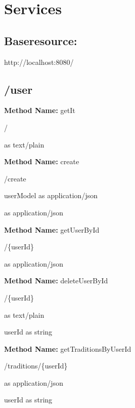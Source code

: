 \chapter{Services}
\section{Baseresource: }
http://localhost:8080/
\section{/user}
\textbf{Method Name: }getIt
\begin{get}
/
\end{get}
\begin{response}
 as text/plain
\end{response}
\textbf{Method Name: }create
\begin{post}
/create
\end{post}
\begin{request}
userModel as application/json
\end{request}
\begin{response}
 as application/json
\end{response}
\textbf{Method Name: }getUserById
\begin{get}
/\{userId\}
\end{get}
\begin{response}
 as application/json
\end{response}
\textbf{Method Name: }deleteUserById
\begin{delete}
/\{userId\}
\end{delete}
\begin{response}
 as text/plain
\end{response}
\begin{parameter}
userId as string
\end{parameter}
\textbf{Method Name: }getTraditionsByUserId
\begin{get}
/traditions/\{userId\}
\end{get}
\begin{response}
 as application/json
\end{response}
\begin{parameter}
userId as string
\end{parameter}

